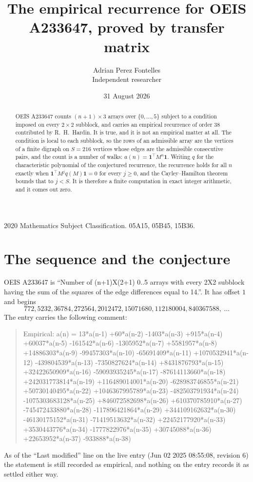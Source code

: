 \documentclass[11pt,a4paper]{article}
\title{The empirical recurrence for OEIS A233647, proved by transfer matrix}
\author{Adrian Perez Fontelles\\ \small Independent researcher}
\date{31 August 2026}
\theoremstyle{plain}
\theoremstyle{definition}
\begin{document}
\maketitle

\begin{abstract}
OEIS A233647 counts $(n+1)\times3$ arrays over $\{0,\dots,5\}$ subject to a condition imposed on
every $2\times2$ subblock, and carries an empirical recurrence of order $38$ contributed
by R.~H.~Hardin. It is true, and it is not an empirical matter at all. The condition is local
to each subblock, so the rows of an admissible array are the vertices of a finite digraph
on $S=216$ vertices whose edges are the admissible consecutive pairs, and the count is a
number of walks: $a(n)=\mathbf{1}^{\!\top}M^{n}\mathbf{1}$. Writing $q$
for the characteristic polynomial of the conjectured recurrence, the recurrence holds for all
$n$ exactly when $\mathbf{1}^{\!\top}M^{j}q(M)\mathbf{1}=0$ for every $j\ge0$, and the
Cayley--Hamilton theorem bounds that to $j<S$. It is therefore a finite computation in exact
integer arithmetic, and it comes out zero.
\end{abstract}

\noindent\small 2020 Mathematics Subject Classification. 05A15, 05B45, 15B36.\normalsize

\section{The sequence and the conjecture}

OEIS A233647 is ``Number of (n+1)X(2+1) 0..5 arrays with every 2X2 subblock having the sum of the squares of the edge differences equal to 14.''. It has offset $1$ and begins
\[
772, 5232, 36784, 272564, 2012472, 15071680, 112180004, 840367588,\ \dots
\]
The entry carries the following comment:
\begin{quote}\small
Empirical: a(n) = 13*a(n-1) +60*a(n-2) -1403*a(n-3) +915*a(n-4) +60037*a(n-5) -161542*a(n-6) -1305952*a(n-7) +5581957*a(n-8) +14886303*a(n-9) -99457303*a(n-10) -65691409*a(n-11) +1070532941*a(n-12) -439804539*a(n-13) -7350827624*a(n-14) +8431876793*a(n-15) +32422650909*a(n-16) -59093935245*a(n-17) -87614113660*a(n-18) +242031773814*a(n-19) +116489014001*a(n-20) -628983746855*a(n-21) +50730140495*a(n-22) +1046367995789*a(n-23) -482503791934*a(n-24) -1075303683128*a(n-25) +846072582698*a(n-26) +610370785910*a(n-27) -745472433880*a(n-28) -117896421864*a(n-29) +344109162632*a(n-30) -46130175152*a(n-31) -71419513632*a(n-32) +22452177920*a(n-33) +3530443776*a(n-34) -1777822976*a(n-35) +30745088*a(n-36) +22653952*a(n-37) -933888*a(n-38)
\end{quote}
As of the ``Last modified'' line on the live entry (Jun 02 2025 08:55:08, revision 6) the statement is
still recorded as empirical, and nothing on the entry records it as settled either way.
\end{document}
